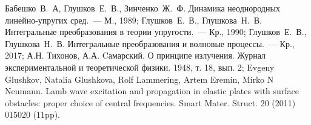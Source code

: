 \documentclass[a4paper, 12pt]{article}
\begin{document}
\begin{thebibliography}{999} 
        Бабешко~В.~А, Глушков~Е.~В., Зинченко~Ж.~Ф. Динамика неоднородных линейно-упругих сред.~---
        М., 1989;
        Глушков~Е.~В., Глушкова~Н.~В. Интегральные преобразования в теории упругости.~---
        Кр., 1990;
        Глушков~Е.~В., Глушкова~Н.~В. Интегральные преобразования и волновые процессы.~---
        Кр., 2017;
        А.Н. Тихонов, А.А. Cамарский. О принципе излучения. Журнал экспериментальной и теоретической физики. 1948, т. 18, вып. 2;
        Evgeny Glushkov, Natalia Glushkova, Rolf Lammering, Artem Eremin, Mirko N Neumann.
        Lamb wave excitation and propagation in elastic plates with surface obstacles: proper choice of central frequencies. Smart Mater. Struct. 20 (2011) 015020 (11pp).
\end{thebibliography}
\end{document}
